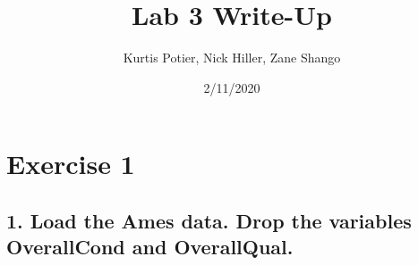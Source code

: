 \documentclass[]{article}
\title{Lab 3 Write-Up}
\author{Kurtis Potier, Nick Hiller, Zane Shango}
\date{2/11/2020}
\begin{document}
\maketitle

\hypertarget{exercise-1}{%
\section{Exercise 1}\label{exercise-1}}

\hypertarget{load-the-ames-data.-drop-the-variables-overallcond-and-overallqual.}{%
\subsection{1. Load the Ames data. Drop the variables OverallCond and
OverallQual.}\label{load-the-ames-data.-drop-the-variables-overallcond-and-overallqual.}}
\end{document}

